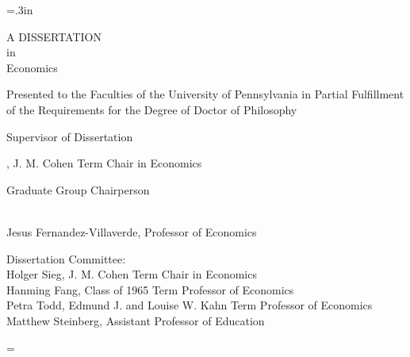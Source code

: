 \large\newlength{\oldparskip}\setlength\oldparskip{\parskip}\parskip=.3in
\thispagestyle{empty}

\begin{center}
\thetitle

\theauthor

A DISSERTATION
\medskip\\
in
\medskip\\
Economics
\end{center}

\noindent\singlespaced\large
Presented to the Faculties of the University of Pennsylvania in Partial
Fulfillment of the Requirements for the Degree of Doctor of Philosophy

\begin{center}
\theyear
\end{center}

\bigskip
\singlespaced
\noindent \begin{minipage}{.45\textwidth}
Supervisor of Dissertation \\
\par\noindent\makebox[2.5in]{\hrulefill}
\theadvisor, J. M. Cohen Term Chair in Economics
\end{minipage}

\bigskip
\noindent Graduate Group Chairperson
\par\noindent\makebox[2.5in]{\hrulefill} \\
\singlespaced
Jesus Fernandez-Villaverde, Professor of Economics\

\noindent
\singlespaced
Dissertation Committee:\\
Holger Sieg, J. M. Cohen Term Chair in Economics\\
Hanming Fang, Class of 1965 Term Professor of Economics\\
Petra Todd, Edmund J. and Louise W. Kahn Term Professor of Economics\\
Matthew Steinberg, Assistant Professor of Education
\vspace*{\fill}

\normalsize\parskip=\oldparskip
